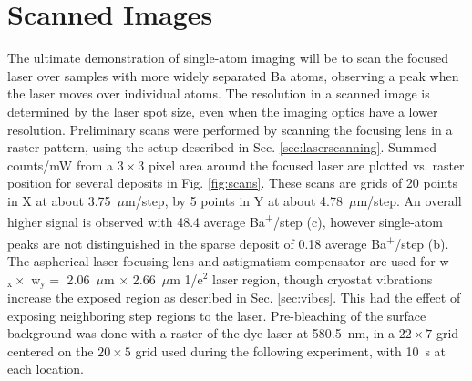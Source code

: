 \section{Scanned Images}
\label{sec:scanning}

The ultimate demonstration of single-atom imaging will be to scan the focused laser over samples with more widely separated Ba atoms, observing a peak when the laser moves over individual atoms.  The resolution in a scanned image is determined by the laser spot size, even when the imaging optics have a lower resolution.  Preliminary scans were performed by scanning the focusing lens in a raster pattern, using the setup described in Sec. \ref{sec:laserscanning}.  Summed counts/mW from a $3 \times 3$ pixel area around the focused laser are plotted vs. raster position for several deposits in Fig. \ref{fig:scans}.  These scans are grids of 20 points in X at about 3.75~$\mu$m/step, by 5 points in Y at about 4.78~$\mu$m/step.  An overall higher signal is observed with 48.4 average Ba\textsuperscript{+}/step (c), however single-atom peaks are not distinguished in the sparse deposit of 0.18 average Ba\textsuperscript{+}/step (b).  The aspherical laser focusing lens and astigmatism compensator are used for w$_{\text{x}} \times$ w$_{\text{y}} =$ 2.06~$\mu$m $\times$ 2.66~$\mu$m 1/e$^{2}$ laser region, though cryostat vibrations increase the exposed region as described in Sec. \ref{sec:vibes}.  This had the effect of exposing neighboring step regions to the laser.  Pre-bleaching of the surface background was done with a raster of the dye laser at 580.5~nm, in a $22 \times 7$ grid centered on the $20 \times 5$ grid used during the following experiment, with 10~s at each location.


